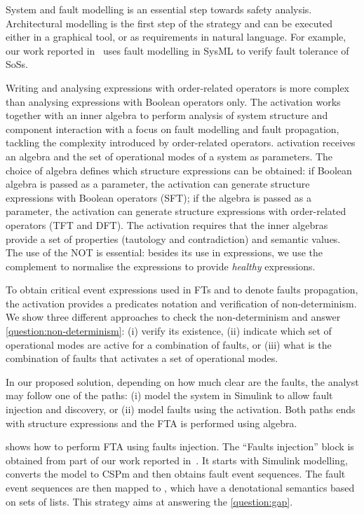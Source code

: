 \documentclass[12pt,openright,twoside,a4paper,oldfontcommands,english,brazil,final]{abntex2}
\theoremstyle{theo}
\newcommand{\simulink}{Simulink\xspace}
\begin{document}
System and fault modelling is an essential step towards safety analysis.
Architectural modelling is the first step of the strategy and can be executed either in a graphical tool, or as requirements in natural language.
For example, our work reported in~\cite{APR+2013,ADP+2013} uses fault modelling in \ac{SysML} to verify fault tolerance of \acp{SoS}.

Writing and analysing expressions with order-related operators is more complex than analysing expressions with Boolean operators only.
The \ac{activation} works together with an inner algebra to perform analysis of system structure and component interaction with a focus on fault modelling and fault propagation, tackling the complexity introduced by order-related operators.
\ac{activation} receives an algebra and the set of operational modes of a system as parameters.
The choice of algebra defines which structure expressions can be obtained: if Boolean algebra is passed as a parameter, the \ac{activation} can generate structure expressions with Boolean operators (\ac{SFT}); if the \ac{algebra} is passed as a parameter, the \ac{activation} can generate structure expressions with order-related operators (\ac{TFT} and \ac{DFT}).
The \ac{activation} requires that the inner algebras provide a set of properties (tautology and contradiction) and semantic values.
The use of the \ac{NOT} is essential: besides its use in expressions, we use the complement to normalise the expressions to provide \emph{healthy} expressions.

To obtain critical event expressions used in \acp{FT} and to denote faults propagation, the \ac{activation} provides a predicates notation and verification of non-determinism. 
We show three different approaches to check the non-determinism and answer \cref{question:non-determinism}: (i) verify its existence, (ii) indicate which set of operational modes are active for a combination of faults, or (iii) what is the combination of faults that activates a set of operational modes.

In our proposed solution, depending on how much clear are the faults, the analyst may follow one of the paths: (i) model the system in \simulink to allow fault injection and discovery, or (ii) model faults using the \acl{activation}.
Both paths ends with structure expressions and the \ac{FTA} is performed using \ac{algebra}.

 shows how to perform \ac{FTA} using faults injection.
The ``Faults injection'' block is obtained from part of our work reported in~\cite{DM2012,Didier2012}.
It starts with \simulink modelling, converts the model to \ac{CSPm} and then obtains fault event sequences.
The fault event sequences are then mapped to , which have a denotational semantics based on sets of lists.
This strategy aims at answering the \cref{question:gap}.
\end{document}

